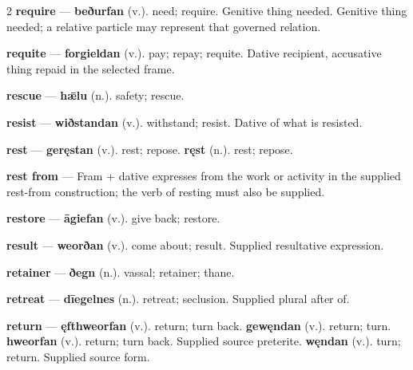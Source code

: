 \begin{multicols}{2}
\textbf{require} — \textbf{beðurfan} (v.). need; require. Genitive thing needed. Genitive thing needed; a relative particle may represent that governed relation.\par
\textbf{requite} — \textbf{forgieldan} (v.). pay; repay; requite. Dative recipient, accusative thing repaid in the selected frame.\par
\textbf{rescue} — \textbf{hǣlu} (n.). safety; rescue.\par
\textbf{resist} — \textbf{wiðstandan} (v.). withstand; resist. Dative of what is resisted.\par
\textbf{rest} — \textbf{geręstan} (v.). rest; repose. \textbf{ręst} (n.). rest; repose.\par
\textbf{rest from} — Fram + dative expresses from the work or activity in the supplied rest-from construction; the verb of resting must also be supplied.\par
\textbf{restore} — \textbf{āgiefan} (v.). give back; restore.\par
\textbf{result} — \textbf{weorðan} (v.). come about; result. Supplied resultative expression.\par
\textbf{retainer} — \textbf{ðegn} (n.). vassal; retainer; thane.\par
\textbf{retreat} — \textbf{dīegelnes} (n.). retreat; seclusion. Supplied plural after of.\par
\textbf{return} — \textbf{ęfthweorfan} (v.). return; turn back. \textbf{gewęndan} (v.). return; turn. \textbf{hweorfan} (v.). return; turn back. Supplied source preterite. \textbf{węndan} (v.). turn; return. Supplied source form.\par

\end{multicols}
